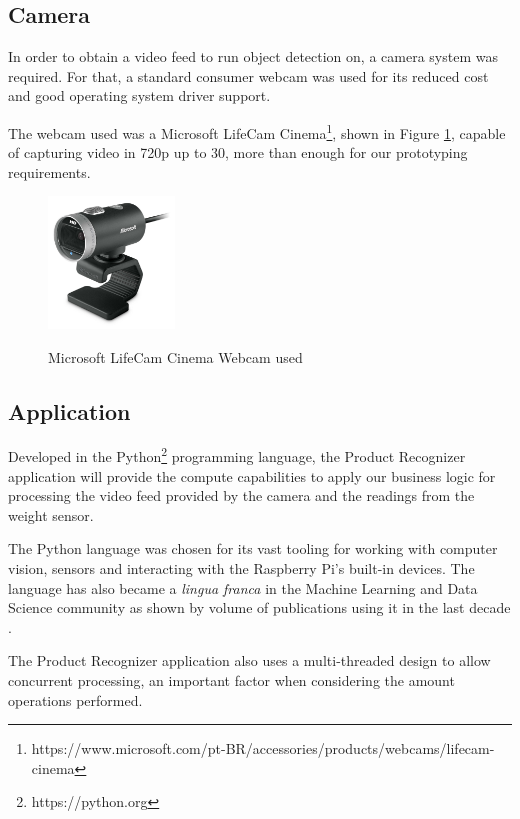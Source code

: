 \subsection{Camera}

In order to obtain a video feed to run object detection on, a camera system was
required. For that, a standard consumer webcam was used for its reduced cost
and good operating system driver support.

The webcam used was a Microsoft LifeCam
Cinema\footnote{https://www.microsoft.com/pt-BR/accessories/products/webcams/lifecam-cinema},
 shown in Figure \ref{fig:camera}, capable of capturing video in 720p up to 30, more
than enough for our prototyping requirements.

\begin{figure}[H]
	\centering
    \caption[Microsoft LifeCam Cinema Webcam used]{Microsoft LifeCam Cinema Webcam used}
    \includegraphics[width=0.3\textwidth]{./images/webcam.jpg}
	\fonte{}
    \label{fig:camera}
\end{figure}

\subsection{Application}

Developed in the Python\footnote{https://python.org} programming language, the
Product Recognizer application will provide the compute capabilities to apply
our business logic for processing the video feed provided by the camera and the
readings from the weight sensor.

The Python language was chosen for its vast tooling for working with computer
vision, sensors and interacting with the Raspberry Pi's built-in devices. The
language has also became a \textit{lingua franca} in the Machine Learning and
Data Science community as shown by volume of publications using it in the last
decade \cite{Wes2017,Joel2019,Andreas2016}.

The Product Recognizer application also uses a multi-threaded design to allow
concurrent processing, an important factor when considering the amount
 operations performed.

